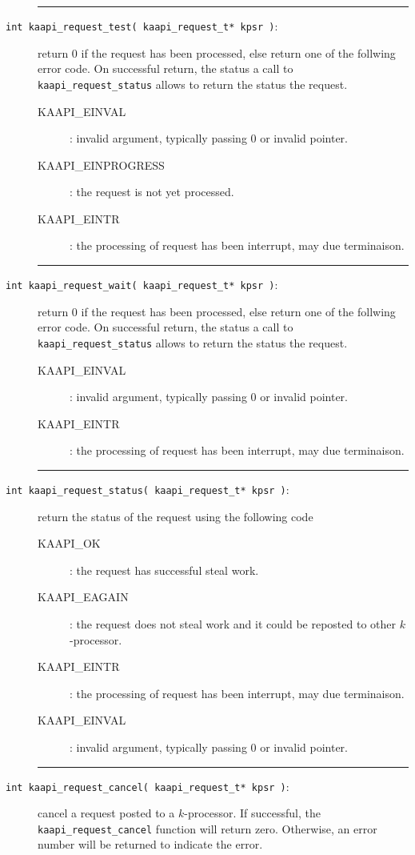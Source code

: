 \documentclass[12pt]{report}
\begin{document}
\begin{description}
\vspace*{3ex} \hrule width 4cm
\item [\texttt{int kaapi\_request\_test(  kaapi\_request\_t* kpsr )}:] return 0 if the request has been processed, else return one of the follwing error code.
On successful return, the status a call to \verb+kaapi_request_status+ allows to return the status the request.
\begin{description}
\item [KAAPI\_EINVAL]: invalid argument, typically passing $0$ or invalid pointer.
\item [KAAPI\_EINPROGRESS]: the request is not yet processed.
\item [KAAPI\_EINTR]: the processing of request has been interrupt, may due terminaison.
\end{description}

\vspace*{3ex} \hrule width 4cm
\item [\texttt{int kaapi\_request\_wait(  kaapi\_request\_t* kpsr )}:] return 0 if the request has been processed, else return one of the follwing error code.
On successful return, the status a call to \verb+kaapi_request_status+ allows to return the status the request.
\begin{description}
\item [KAAPI\_EINVAL]: invalid argument, typically passing $0$ or invalid pointer.
\item [KAAPI\_EINTR]: the processing of request has been interrupt, may due terminaison.
\end{description}


\vspace*{3ex} \hrule width 4cm 
\item [\texttt{int kaapi\_request\_status(  kaapi\_request\_t* kpsr )}:] return the status of the request using the following code
\begin{description}
\item [KAAPI\_OK]: the request has successful steal work.
\item [KAAPI\_EAGAIN]: the request does not steal work and it could be reposted to other $k$-processor.
\item [KAAPI\_EINTR]: the processing of request has been interrupt, may due terminaison.
\item [KAAPI\_EINVAL]: invalid argument, typically passing $0$ or invalid pointer.
\end{description}

\vspace*{3ex} \hrule width 4cm 
\item [\texttt{int kaapi\_request\_cancel(  kaapi\_request\_t* kpsr )}:] cancel a request posted to a $k$-processor. 
If successful,  the \verb+kaapi_request_cancel+ function will return zero.  Otherwise, an error number will be returned to indicate the error.


\end{description}
\end{document}
